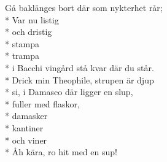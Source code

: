 \begin{SongText}
\begin{SongVerse}
        Gå baklänges bort där som nykterhet rår;\\*%
        Var nu listig\\*%
        och dristig\\*%
        stampa\\*%
        trampa\\*%
        i Bacchi vingård stå kvar där du står.\\*%
        Drick min Theophile, strupen är djup\\*%
        si, i Damasco där ligger en slup,\\*%
        fuller med flaskor,\\*%
        damasker\\*%
        kantiner\\*%
        och viner\\*%
        Åh kära, ro hit med en sup!
    \end{SongVerse}
\end{SongText}
